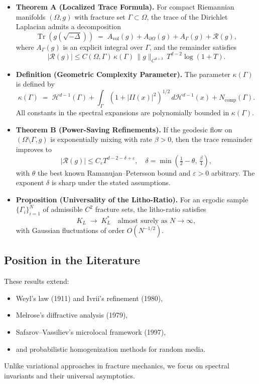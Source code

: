 \begin{itemize}
    \item \textbf{Theorem A (Localized Trace Formula).} 
    For compact Riemannian manifolds $(\Omega,g)$ with fracture set
    $\Gamma \subset \Omega$, the trace of the Dirichlet Laplacian admits
    a decomposition
    \[
      \operatorname{Tr}(g(\sqrt{-\Delta})) \;=\;
        A_{\mathrm{vol}}(g) + A_{\partial\Omega}(g) + A_{\Gamma}(g) + \mathcal{R}(g),
    \]
    where $A_{\Gamma}(g)$ is an explicit integral over $\Gamma$, and the
    remainder satisfies
    \[
      |\mathcal{R}(g)| \leq C(\Omega,\Gamma)\,\kappa(\Gamma)\,\|g\|_{C^{d+3}} \,
          T^{d-2}\log(1+T).
    \]

    \item \textbf{Definition (Geometric Complexity Parameter).}
    The parameter $\kappa(\Gamma)$ is defined by
    \[
    \kappa(\Gamma) \;=\;
      \mathcal{H}^{d-1}(\Gamma) +
      \int_\Gamma (1+|II(x)|^2)^{1/2} \, d\mathcal{H}^{d-1}(x) +
      N_{\text{comp}}(\Gamma).
    \]
    All constants in the spectral expansions are polynomially bounded in
    $\kappa(\Gamma)$.

    \item \textbf{Theorem B (Power-Saving Refinements).}
    If the geodesic flow on $(\Omega \setminus \Gamma,g)$ is
    exponentially mixing with rate $\beta>0$, then the trace remainder
    improves to
    \[
      |\mathcal{R}(g)| \leq C_\varepsilon T^{d-2-\delta+\varepsilon},
      \quad \delta = \min\!\left(\tfrac{1}{2}-\theta,\, \tfrac{\beta}{4}\right),
    \]
    with $\theta$ the best known Ramanujan--Petersson bound and
    $\varepsilon > 0$ arbitrary. The exponent $\delta$ is sharp under the
    stated assumptions.

    \item \textbf{Proposition (Universality of the Litho-Ratio).}
    For an ergodic sample $\{\Gamma_i\}_{i=1}^N$ of admissible $C^2$
    fracture sets, the litho-ratio satisfies
    \[
      K_L \;\to\; K_L^* \quad \text{almost surely as } N \to \infty,
    \]
    with Gaussian fluctuations of order $O(N^{-1/2})$.
\end{itemize}

\subsection{Position in the Literature}

These results extend:
\begin{itemize}
    \item Weyl’s law (1911) and Ivrii’s refinement (1980),
    \item Melrose’s diffractive analysis (1979),
    \item Safarov--Vassiliev’s microlocal framework (1997),
    \item and probabilistic homogenization methods for random media.
\end{itemize}
Unlike variational approaches in fracture mechanics, we focus on
spectral invariants and their universal asymptotics.

